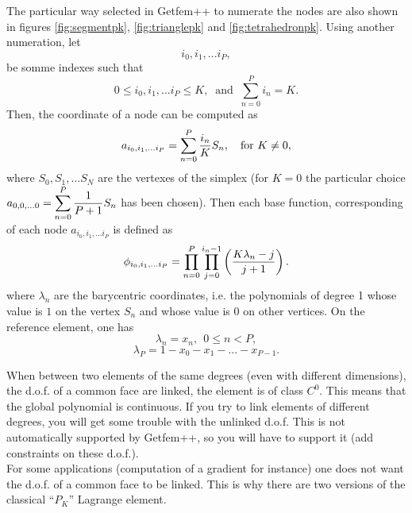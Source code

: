 \documentclass[11pt,a4paper]{article}
\begin{document}
The particular way selected in {\sc Getfem++} to numerate the nodes are also shown in figures \ref{fig:segmentpk}, \ref{fig:trianglepk} and \ref{fig:tetrahedronpk}. Using another numeration, let 
$$ i_0, i_1, ... i_P, $$
be somme indexes such that
$$ 0 \leq i_0, i_1, ... i_P \leq K, \ \mbox{ and } \ \sum_{n = 0}^{P} i_n = K.$$
Then, the coordinate of a node can be computed as
$$ a_{i_0, i_1, ... i_P} = \sum_{n = 0}^{P} {\displaystyle \frac{\displaystyle i_n}{\displaystyle K}}S_n, \ \ \mbox{ for } K \neq 0, $$
where $S_0, S_1, ... S_N$ are the vertexes of the simplex (for $K = 0$ the particular choice $a_{0, 0, ... 0} = \displaystyle \sum_{n = 0}^{P} {\displaystyle \frac{\displaystyle 1}{\displaystyle P+1}}S_n$ has been chosen).
Then each base function, corresponding of each node $a_{i_0, i_1, ... i_P}$ is defined as
$$ \phi_{i_0, i_1, ... i_P} = \prod_{n = 0}^{P} \prod_{j=0}^{i_n-1} \left({\displaystyle \frac{\displaystyle K \lambda_n - j}{\displaystyle j+1}}\right).$$
where $\lambda_n$ are the barycentric coordinates, i.e. the polynomials of degree 1 whose value is $1$ on the vertex $S_n$ and whose value is $0$ on other vertices. On the reference element, one has
$$ \lambda_n = x_n, \ \ 0 \leq n < P, $$
$$ \lambda_P = 1 - x_0 - x_1 - ... - x_{P-1}. $$

When between two elements of the same degrees (even with different dimensions), the d.o.f. of a common face are linked, the element is of class $C^0$. This means that the global polynomial is continuous. If you try to link elements of different degrees, you will get some trouble with the unlinked d.o.f. This is not automatically supported by {\sc Getfem++}, so you will have to support it (add constraints on these d.o.f.).\\

For some applications (computation of a gradient for instance) one does not want the d.o.f. of a common face to be linked. This is why there are two versions of the classical ``$P_K$'' Lagrange element.\\[1cm]
\end{document}
